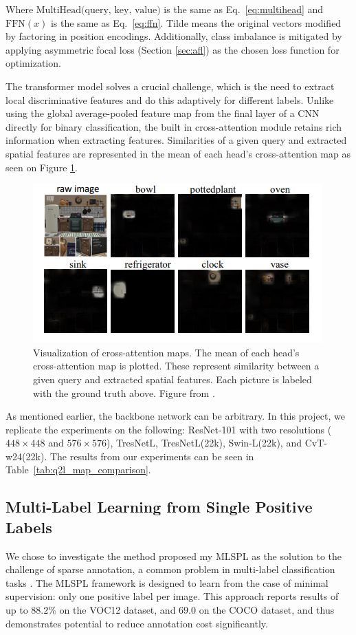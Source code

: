 \documentclass[lettersize,journal]{IEEEtran}
\begin{document}
Where $\text{MultiHead(query, key, value)}$ is the same as Eq.~\ref{eq:multihead} and $\text{FFN}(x)$ is the same as Eq.~\ref{eq:ffn}. Tilde means the original vectors modified by factoring in position encodings. Additionally, class imbalance is mitigated by applying asymmetric focal loss (Section \ref{sec:afl}) as the chosen loss function for optimization.

The transformer model solves a crucial challenge, which is the need to extract local discriminative features and do this adaptively for different labels. Unlike using the global average-pooled feature map from the final layer of a CNN directly for binary classification, the built in cross-attention module retains rich information when extracting features. Similarities of a given query and extracted spatial features are represented in the mean of each head's cross-attention map as seen on Figure \ref{fig:q2l_attention}.

\begin{figure}[t]
    \centering
    \includegraphics[width=.8\linewidth]{images/q2l_attention.PNG}
    \caption{Visualization of cross-attention maps. The mean of each head's cross-attention map is plotted. These represent similarity between a given query and extracted spatial features. Each picture is labeled with the ground truth above. Figure from \cite{Query2Label}.}
    \label{fig:q2l_attention}
\end{figure}

As mentioned earlier, the backbone network can be arbitrary. In this project, we replicate the experiments on the following: ResNet-101 with two resolutions ($448\times 448$ and $576\times 576$), TresNetL, TresNetL(22k), Swin-L(22k), and CvT-w24(22k). The results from our experiments can be seen in Table~\ref{tab:q2l_map_comparison}.

\subsection{Multi-Label Learning from Single Positive Labels}
We chose to investigate the method proposed my MLSPL as the solution to the challenge of sparse annotation, a common problem in multi-label classification tasks \cite{mlsp}. The MLSPL framework is designed to learn from the case of minimal supervision: only one positive label per image. This approach reports results of up to $88.2\%$ on the VOC12 dataset, and $69.0$ on the COCO dataset, and thus demonstrates potential to reduce annotation cost significantly.
\end{document}
